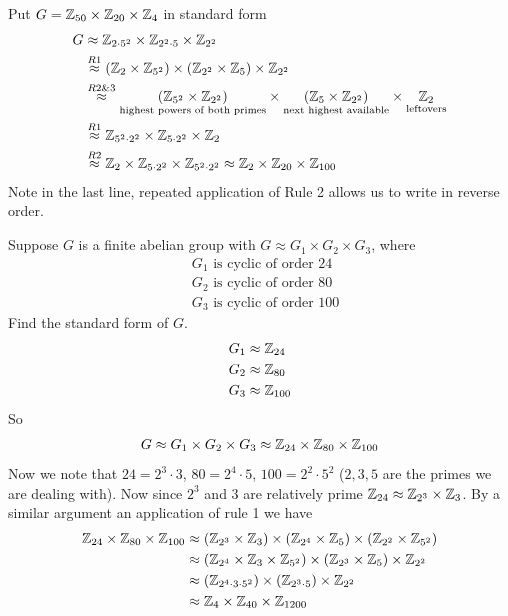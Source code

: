 \begin{example}
Put $G= {\mathbb{Z}}_{50}\times {\mathbb{Z}}_{20}\times {\mathbb{Z}}_4$ in standard form
\begin{align}
    G &\approx {\mathbb{Z}}_{2\cdot 5^2}\times {\mathbb{Z}}_{2^2\cdot 5}\times {\mathbb{Z}}_{2^2} \nonumber \\
    &\overset{R1}{\approx} ({\mathbb{Z}}_2\times {\mathbb{Z}}_{5^2})\times ({\mathbb{Z}}_{2^2}\times {\mathbb{Z}}_{5})\times {\mathbb{Z}}_{2^2} \nonumber \\
    &\overset{R2\&3}{\approx}\underset{\text{highest powers of both primes}}{({\mathbb{Z}}_{5^2}\times {\mathbb{Z}}_{2^2})}\times \underset{\text{next highest available}}{({\mathbb{Z}}_{5}\times {\mathbb{Z}}_{2^2})}\times \underset{\text{leftovers}}{{\mathbb{Z}}_2} \nonumber \\
    &\overset{R1}{\approx} {\mathbb{Z}}_{5^2\cdot 2^2}\times {\mathbb{Z}}_{5\cdot 2^2}\times {\mathbb{Z}}_{2} \nonumber \\
    &\overset{R2}{\approx} {\mathbb{Z}}_2 \times {\mathbb{Z}}_{5\cdot 2^2}\times {\mathbb{Z}}_{5^2 \cdot 2^2} \approx {\mathbb{Z}}_2\times {\mathbb{Z}}_{20} \times {\mathbb{Z}}_{100} \nonumber
\end{align}
Note in the last line, repeated application of Rule 2 allows us to write in reverse order.
\end{example}

\begin{example}
Suppose $G$ is a finite abelian group with $G\approx G_1\times G_2\times G_3$, where
\begin{align}
    &G_1 \text{ is cyclic of order }24 \nonumber \\
    &G_2 \text{ is cyclic of order }80 \nonumber \\
    &G_3 \text{ is cyclic of order }100 \nonumber
\end{align}
Find the standard form of $G$.
\begin{align}
    G_1 &\approx {\mathbb{Z}}_{24} \nonumber \\
    G_2 &\approx {\mathbb{Z}}_{80} \nonumber \\
    G_3 &\approx {\mathbb{Z}}_{100} \nonumber
\end{align}
So
\begin{align}
  G\approx G_1\times G_2\times G_3 \approx {\mathbb{Z}}_{24}\times {\mathbb{Z}}_{80}\times {\mathbb{Z}}_{100}  \nonumber
\end{align}
Now we note that $24=2^3\cdot 3$, $80=2^4\cdot 5$, $100=2^2\cdot 5^2$ ($2,3,5$ are the primes we are
dealing with). Now since $2^3$ and $3$ are relatively prime ${\mathbb{Z}}_{24}\approx {\mathbb{Z}}_{2^3}\times {\mathbb{Z}}_{3}$.
By a similar argument an application of rule 1 we have
\begin{align}
    {\mathbb{Z}}_{24}\times {\mathbb{Z}}_{80} \times {\mathbb{Z}}_{100} &\approx ({\mathbb{Z}}_{2^3}\times {\mathbb{Z}}_{3})\times ({\mathbb{Z}}_{2^4}\times {\mathbb{Z}}_{5})\times ({\mathbb{Z}}_{2^2}\times {\mathbb{Z}}_{5^2}) \nonumber \\
    &\approx ({\mathbb{Z}}_{2^4}\times {\mathbb{Z}}_{3}\times {\mathbb{Z}}_{5^2})\times ({\mathbb{Z}}_{2^3}\times {\mathbb{Z}}_{5})\times {\mathbb{Z}}_{2^2} \nonumber \\
    &\approx ({\mathbb{Z}}_{2^4\cdot 3 \cdot 5^2})\times ({\mathbb{Z}}_{2^3\cdot 5})\times {\mathbb{Z}}_{2^2} \nonumber \\
    &\approx {\mathbb{Z}}_{4}\times {\mathbb{Z}}_{40} \times {\mathbb{Z}}_{1200} \nonumber
\end{align}
\end{example}

